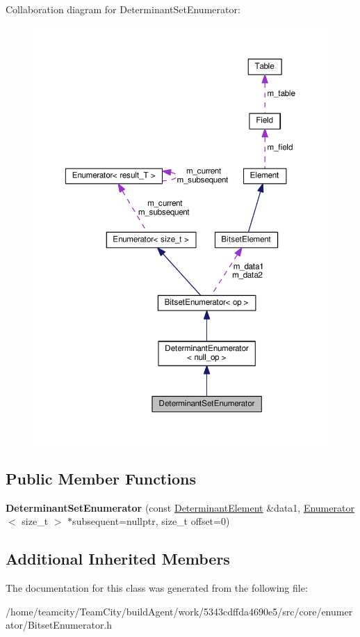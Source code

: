 Collaboration diagram for Determinant\+Set\+Enumerator\+:\nopagebreak
\begin{figure}[H]
\begin{center}
\leavevmode
\includegraphics[width=350pt]{classDeterminantSetEnumerator__coll__graph}
\end{center}
\end{figure}
\subsection*{Public Member Functions}
\begin{DoxyCompactItemize}
\item 
{\bfseries Determinant\+Set\+Enumerator} (const \hyperlink{classDeterminantElement}{Determinant\+Element} \&data1, \hyperlink{classEnumerator}{Enumerator}$<$ size\+\_\+t $>$ $\ast$subsequent=nullptr, size\+\_\+t offset=0)\hypertarget{classDeterminantSetEnumerator_ad0f4b145140c6f643c0a1d849b2cd527}{}\label{classDeterminantSetEnumerator_ad0f4b145140c6f643c0a1d849b2cd527}

\end{DoxyCompactItemize}
\subsection*{Additional Inherited Members}


The documentation for this class was generated from the following file\+:\begin{DoxyCompactItemize}
\item 
/home/teamcity/\+Team\+City/build\+Agent/work/5343cdffda4690e5/src/core/enumerator/Bitset\+Enumerator.\+h\end{DoxyCompactItemize}

